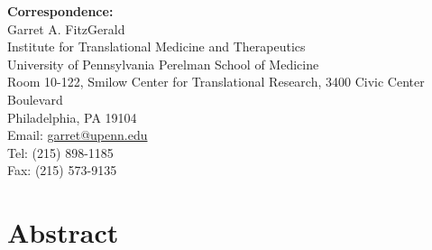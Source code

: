 \documentclass[12pt]{article}
\begin{document}
\begin{titlepage}
\begin{flushleft}
\textbf{Correspondence:}\\
Garret A. FitzGerald\\
Institute for Translational Medicine and Therapeutics\\
University of Pennsylvania Perelman School of Medicine\\
Room 10-122, Smilow Center for Translational Research, 3400 Civic Center Boulevard\\
Philadelphia, PA 19104\\
Email: \href{mailto:garret@upenn.edu}{garret@upenn.edu}\\
Tel: (215) 898-1185\\
Fax: (215) 573-9135
\end{flushleft}

\end{titlepage}

\section*{Abstract}
\end{document}
